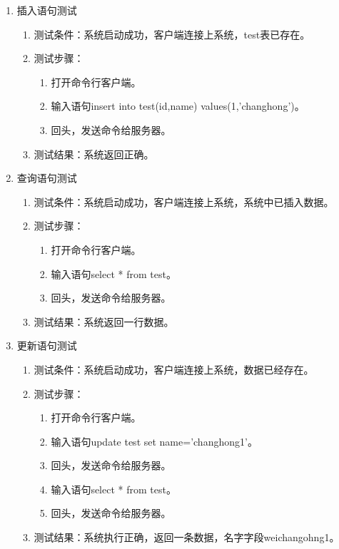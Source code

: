 \begin{enumerate}
\item 插入语句测试
\begin{enumerate}
	\item 测试条件：系统启动成功，客户端连接上系统，test表已存在。
	\item 测试步骤：
	\begin{enumerate}
		\item 打开命令行客户端。
		\item 输入语句insert into test(id,name) values(1,'changhong')。
		\item 回头，发送命令给服务器。
	\end{enumerate}
	\item 	测试结果：系统返回正确。
\end{enumerate}	


\item 查询语句测试
\begin{enumerate}
	\item 测试条件：系统启动成功，客户端连接上系统，系统中已插入数据。
	\item 测试步骤：
	\begin{enumerate}
		\item 打开命令行客户端。
		\item 输入语句select * from test。
		\item 回头，发送命令给服务器。
	\end{enumerate}
	\item 	测试结果：系统返回一行数据。
\end{enumerate}	



\item 更新语句测试
\begin{enumerate}
	\item 测试条件：系统启动成功，客户端连接上系统，数据已经存在。
	\item 测试步骤：
	\begin{enumerate}
		\item 打开命令行客户端。
		\item 输入语句update test set name='changhong1'。
		\item 回头，发送命令给服务器。
		\item 输入语句select * from test。
		\item 回头，发送命令给服务器。
	\end{enumerate}
	\item 	测试结果：系统执行正确，返回一条数据，名字字段weichangohng1。
\end{enumerate}	



\end{enumerate}
